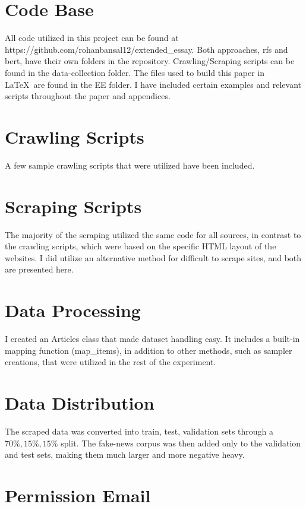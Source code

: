 \section{Code Base}
\label{appendix:code-base}
All code utilized in this project can be found at https://github.com/rohanbansal12/extended\_essay. Both approaches, \acrlong{rfs} and \acrshort{bert}, have their own folders in the repository. Crawling/Scraping scripts can be found in the data-collection folder. The files used to build this paper in \LaTeX\ are found in the EE folder. I have included certain examples and relevant scripts throughout the paper and appendices. 

\section{Crawling Scripts}
\label{appendix:crawling}
A few sample crawling scripts that were utilized have been included.


\section{Scraping Scripts}
\label{appendix:scraping}
The majority of the scraping utilized the same code for all sources, in contrast to the crawling scripts, which were based on the specific HTML layout of the websites. I did utilize an alternative method for difficult to scrape sites, and both are presented here.


\section{Data Processing}
\label{appendix:processing}
I created an Articles class that made dataset handling easy. It includes a built-in mapping function (map\_items), in addition to other methods, such as sampler creations, that were utilized in the rest of the experiment.


\section{Data Distribution}
\label{appendix:data-info}
The scraped data was converted into train, test, validation sets through a $70\%, 15\%, 15\%$ split. The fake-news corpus was then added only to the validation and test sets, making them much larger and more negative heavy.


\section{Permission Email}
\label{appendix:permission}
